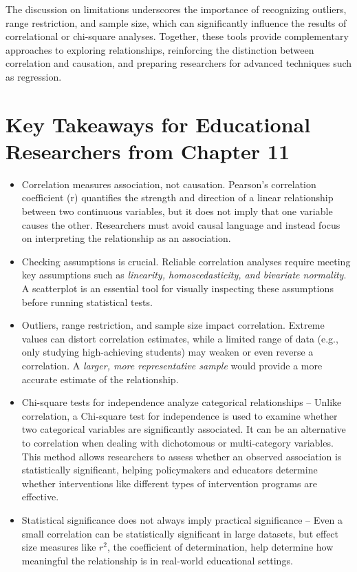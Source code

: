 \documentclass[
  letterpaper,
  DIV=11,
  numbers=noendperiod]{scrreprt}
\begin{document}
The discussion on limitations underscores the importance of recognizing
outliers, range restriction, and sample size, which can significantly
influence the results of correlational or chi-square analyses. Together,
these tools provide complementary approaches to exploring relationships,
reinforcing the distinction between correlation and causation, and
preparing researchers for advanced techniques such as regression.

\section*{Key Takeaways for Educational Researchers from Chapter
11}\label{key-takeaways-for-educational-researchers-from-chapter-11}


\begin{itemize}
\item
  Correlation measures association, not causation. Pearson's correlation
  coefficient (r) quantifies the strength and direction of a linear
  relationship between two continuous variables, but it does not imply
  that one variable causes the other. Researchers must avoid causal
  language and instead focus on interpreting the relationship as an
  association.
\item
  Checking assumptions is crucial. Reliable correlation analyses require
  meeting key assumptions such as \emph{linearity, homoscedasticity, and
  bivariate normality}. A scatterplot is an essential tool for visually
  inspecting these assumptions before running statistical tests.
\item
  Outliers, range restriction, and sample size impact correlation.
  Extreme values can distort correlation estimates, while a limited
  range of data (e.g., only studying high-achieving students) may weaken
  or even reverse a correlation. A \emph{larger, more representative
  sample} would provide a more accurate estimate of the relationship.
\item
  Chi-square tests for independence analyze categorical relationships --
  Unlike correlation, a Chi-square test for independence is used to
  examine whether two categorical variables are significantly
  associated. It can be an alternative to correlation when dealing with
  dichotomous or multi-category variables. This method allows
  researchers to assess whether an observed association is statistically
  significant, helping policymakers and educators determine whether
  interventions like different types of intervention programs are
  effective.
\item
  Statistical significance does not always imply practical significance
  -- Even a small correlation can be statistically significant in large
  datasets, but effect size measures like \(r^2\), the coefficient of
  determination, help determine how meaningful the relationship is in
  real-world educational settings.
\end{itemize}
\end{document}
